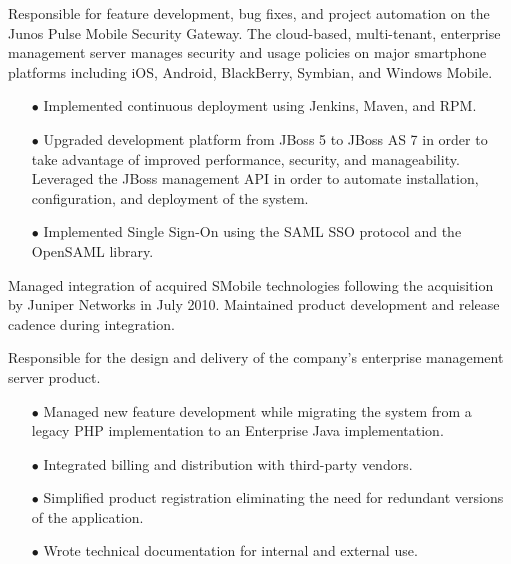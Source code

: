 \documentclass[12pt,letter,roman]{moderncv}
\begin{document}
Responsible for feature development, bug fixes, and project automation on the
Junos Pulse Mobile Security Gateway.  The cloud-based, multi-tenant, enterprise
management server manages security and usage policies on major
smartphone platforms including iOS, Android, BlackBerry, Symbian, and Windows
Mobile.

\begin{itemize}

    \item[$\bullet$] Implemented continuous deployment using Jenkins, Maven, and RPM.

    \item[$\bullet$] Upgraded development platform from JBoss 5 to JBoss AS 7 in order to
        take advantage of improved performance, security, and manageability.
        Leveraged the JBoss management API in order to automate installation,
        configuration, and deployment of the system.

    \item[$\bullet$] Implemented Single Sign-On using the SAML SSO protocol and the OpenSAML
        library.

\end{itemize}

\vspace{0.5em}

Managed integration of acquired SMobile technologies following the
acquisition by Juniper Networks in July 2010.  Maintained product
development and release cadence during integration.

\vspace{0.5em}

Responsible for the design and delivery of the company's enterprise management
server product.

\begin{itemize}

    \item[$\bullet$] Managed new feature development while migrating the system from a
        legacy PHP implementation to an Enterprise Java implementation.

    \item[$\bullet$] Integrated billing and distribution with third-party vendors.

    \item[$\bullet$] Simplified product registration eliminating the need for redundant
        versions of the application.

    \item[$\bullet$] Wrote technical documentation for internal and external use.

\end{itemize}
\end{document}
